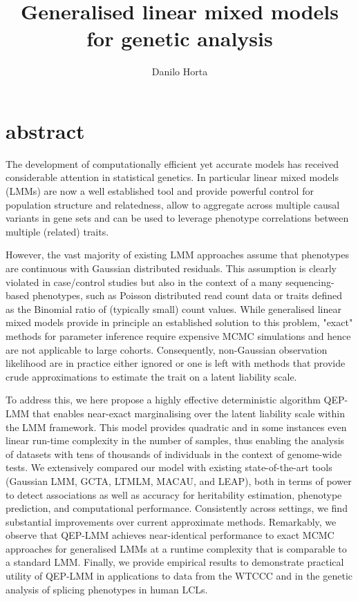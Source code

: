 \documentclass{TMarticle}
\author{Danilo Horta}
\title{Generalised linear mixed models for genetic analysis}
\begin{document}
\maketitle

\section{abstract}

The development of computationally efficient yet accurate models has received
considerable attention in statistical genetics. In particular linear mixed
models (LMMs) are now a well established tool and provide powerful control for
population structure and relatedness, allow to aggregate across multiple causal
variants in gene sets and can be used to leverage phenotype correlations between
multiple (related) traits.

However, the vast majority of existing LMM approaches assume that phenotypes
are continuous with Gaussian distributed residuals. This assumption is clearly
violated in case/control studies but also in the context of a many
sequencing-based phenotypes, such as Poisson distributed read count data or
traits defined as the Binomial ratio of (typically small) count values. While
generalised linear mixed models provide in principle an established solution to
this problem, "exact" methods for parameter inference require expensive MCMC
simulations and hence are not applicable to large cohorts. Consequently,
non-Gaussian observation likelihood are in practice either ignored or one is
left with methods that provide crude approximations to estimate the trait on a
latent liability scale.

To address this, we here propose a highly effective deterministic algorithm
QEP-LMM that enables near-exact marginalising over the latent liability scale
within the LMM framework. This model provides quadratic and in some instances
even linear run-time complexity in the number of samples, thus enabling the
analysis of datasets with tens of thousands of individuals in the context of
genome-wide tests. We extensively compared our model with existing
state-of-the-art tools (Gaussian LMM, GCTA, LTMLM, MACAU, and LEAP), both in
terms of power to detect associations as well as accuracy for heritability
estimation, phenotype prediction, and computational performance. Consistently
across settings, we find substantial improvements over current approximate
methods. Remarkably, we observe that QEP-LMM achieves near-identical performance
to exact MCMC approaches for generalised LMMs at a runtime complexity that is
comparable to a standard LMM. Finally, we provide empirical results to
demonstrate practical utility of QEP-LMM in applications to data from the WTCCC
and in the genetic analysis of splicing phenotypes in human LCLs.
\end{document}

